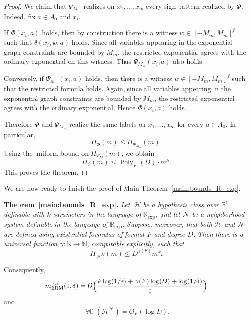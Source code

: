 \documentclass[11pt]{article}
\theoremstyle{plain}
\theoremstyle{definition}
\theoremstyle{remark}
\newenvironment{restatedtheorem}[1]
  {\par\noindent\textbf{Theorem~\ref{#1}.}\itshape}
  {\par}
\DeclareMathOperator{\VCdim}{\mathbb{VC}}
\newcommand{\N}{\mathbb{N}}
\newcommand{\cH}{\mathcal{H}}
\newcommand{\cN}{\mathcal{N}}
\newcommand{\Poly}{\operatorname{Poly}}
\begin{document}
\begin{proof}
We claim that \(\Psi_{M_m}\) realizes on \(x_1,\ldots,x_m\) every sign pattern
realized by \(\Phi\). Indeed, fix \(a\in A_0\) and \(x_i\).

If \(\Phi(x_i,a)\) holds, then by construction there is a witness
\(w\in[-M_m,M_m]^f\) such that \(\theta(x_i,w,a)\) holds. Since all variables
appearing in the exponential graph constraints are bounded by \(M_m\), the
restricted exponential agrees with the ordinary exponential on this witness.
Thus \(\Psi_{M_m}(x_i,a)\) also holds.

Conversely, if \(\Psi_{M_m}(x_i,a)\) holds, then there is a witness
\(w\in[-M_m,M_m]^f\) such that the restricted formula holds. Again, since all
variables appearing in the exponential graph constraints are bounded by
\(M_m\), the restricted exponential agrees with the ordinary exponential.
Hence \(\Phi(x_i,a)\) holds.

Therefore \(\Phi\) and \(\Psi_{M_m}\) realize the same labels on \(x_1,\ldots,x_m\) for every \(a\in A_0\). In particular,
\[
  \Pi_{\Phi}(m)
  \le
  \Pi_{\Psi_{M_m}}(m).
\]
Using the uniform bound on \(\Pi_{\Psi_M}(m)\), we obtain
\[
  \Pi_{\Phi}(m)
  \le
  \Poly_F(D)\cdot m^k .
\]
This proves the theorem.
\end{proof}


We are now ready to finish the proof of Main Theorem~\ref{main:bounds_R_exp}.

\begin{restatedtheorem}{main:bounds_R_exp}
Let~$\mathcal H$ be a hypothesis class over $\mathbb R^l$ definable with $k$ parameters in the language of $\mathbb R_{\exp}$, and let $\mathcal N$ be a neighborhood system definable in the language of $\mathbb R_{\exp}$. Suppose, moreover, that both $\mathcal H$ and $\mathcal N$ are defined using existential formulas of format $F$ and degree $D$. Then there is a universal
function \(\gamma\colon \N\to\N\), computable explicitly, such that
\[
  \Pi_{\cH^\cN}(m) \le D^{\gamma(F)} m^k .
\]

Consequently,
\[
  m_{\mathrm{ERM}}^{\mathrm{real}}(\varepsilon,\delta)=  O\Bigl(\frac{k\log(1/\varepsilon) + \gamma(F) \log(D) + \log(1/\delta)}{\varepsilon}\Bigr)
\]
and
\[
\VCdim(\mathcal H^\mathcal N)  = O_F(\log D).
\]
\end{restatedtheorem}
\end{document}
